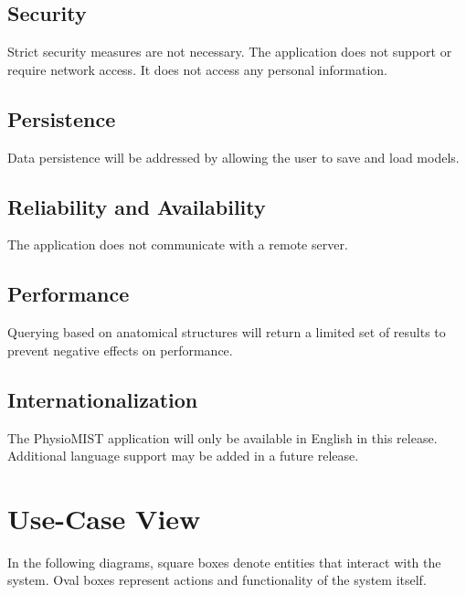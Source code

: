 \documentclass{article}
\newcommand{\todo}[1]{\colorbox{red}{\begin{minipage}{\textwidth}{#1}\end{minipage}}}
\begin{document}
\subsection{Security}
Strict security measures are not necessary. The application does not support or require network access. It does not access any personal information.
\subsection{Persistence}
Data persistence will be addressed by allowing the user to save and load models.
\subsection{Reliability and Availability}
The application does not communicate with a remote server.
\subsection{Performance}
Querying based on anatomical structures will return a limited set of results to prevent negative effects on performance.
\subsection{Internationalization}
The PhysioMIST application will only be available in English in this release. Additional language support may be added in a future release.

\section{Use-Case View}
In the following diagrams, square boxes denote entities that interact with the system.  Oval boxes represent actions and functionality of the system itself.
\end{document}
